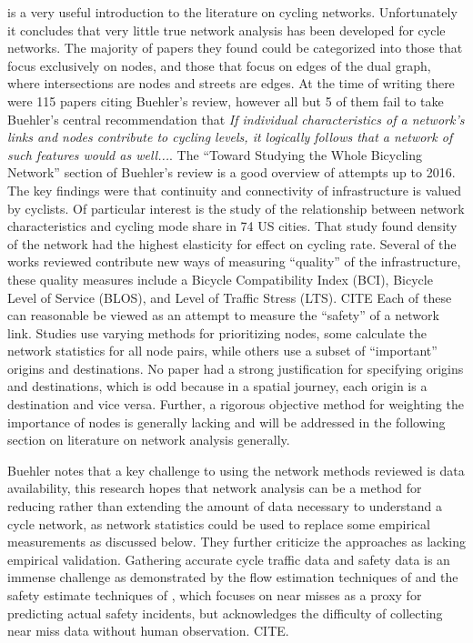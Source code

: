 \documentclass[11pt]{article} %
\begin{document}
\cite{buehler2016bikeway} is a very useful introduction to the literature on cycling networks. Unfortunately it concludes that very little true network analysis has been developed for cycle networks. The majority of papers they found could be categorized into those that focus exclusively on nodes, and those that focus on edges of the dual graph, where intersections are nodes and streets are edges. At the time of writing there were 115 papers citing Buehler's review, however all but 5 of them fail to take Buehler's central recommendation that \textit{If individual characteristics of a network's links and nodes contribute to cycling
levels, it logically follows that a network of such features would as well...}. The ``Toward Studying the Whole Bicycling Network'' section of Buehler's review is a good overview of attempts up to 2016. The key findings were that continuity and connectivity of infrastructure is valued by cyclists. Of particular interest is the \cite{schoner2014missing} study of the relationship between network characteristics and cycling mode share in 74 US cities. That study found density of the network had the highest elasticity for effect on cycling rate. Several of the works reviewed contribute new ways of measuring ``quality'' of the infrastructure, these quality measures include a Bicycle Compatibility Index (BCI),  Bicycle Level of Service (BLOS), and Level of Traffic Stress (LTS). CITE Each of these can reasonable be viewed as an attempt to measure the ``safety'' of a network link. Studies use varying methods for prioritizing nodes, some calculate the network statistics for all node pairs, while others use a subset of ``important'' origins and destinations. No paper had a strong justification for specifying origins and destinations, which is odd because in a spatial journey, each origin is a destination and vice versa. Further, a rigorous objective method for weighting the importance of nodes is generally lacking and will be addressed in the following section on literature on network analysis generally.



Buehler notes that a key challenge to using the network methods reviewed is data availability, this research hopes that network analysis can be a method for reducing rather than extending the amount of data necessary to understand a cycle network, as network statistics could be used to replace some empirical measurements as discussed below.  They further criticize the approaches as lacking empirical validation. Gathering accurate cycle traffic data and safety data is an immense challenge as demonstrated by the flow estimation techniques of \cite{gosse2014estimating} and the safety estimate techniques of \cite{puchades2018role}, which focuses on near misses as a proxy for predicting actual safety incidents, but acknowledges the difficulty of collecting near miss data without human observation. CITE. 
\end{document}
